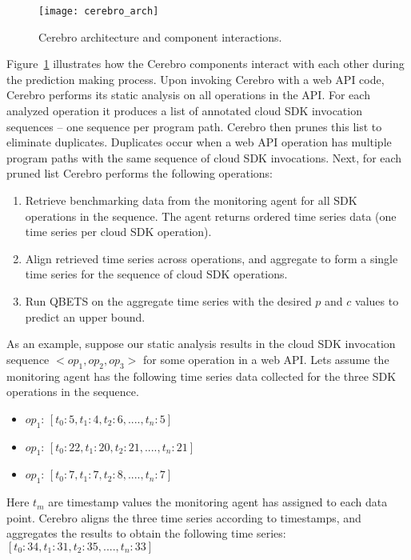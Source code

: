 \begin{figure}
\centering
\texttt{[image: cerebro\_arch]}
\caption{Cerebro architecture and component interactions.}
\label{fig:cerebro_arch}
\end{figure}

Figure~\ref{fig:cerebro_arch} illustrates how the Cerebro components interact with
each other during the prediction making process.
Upon invoking Cerebro with a web API code, Cerebro
performs its static analysis on all operations in the API. For each
analyzed operation it produces a list of annotated cloud SDK invocation sequences --
one sequence per program path. Cerebro then prunes this list to eliminate duplicates.
Duplicates occur when a web API operation has
multiple program paths with the same sequence of cloud SDK invocations.
Next, for each pruned list Cerebro performs the following operations:
\begin{enumerate}
\item Retrieve benchmarking data from the monitoring agent 
for all SDK operations in the sequence. The agent returns
ordered time series data (one time series per cloud SDK operation).
\item Align retrieved time series across operations, and aggregate
to form a single time series for the sequence of cloud SDK operations.
\item Run QBETS on the aggregate time series with the 
desired $p$ and $c$ values to predict an upper bound. 
\end{enumerate}

As an example, suppose our static analysis results in the
cloud SDK invocation sequence $<op_{1},op_{2},op_{3}>$ for
some operation in a web API. 
Lets assume the monitoring agent has the following
time series data collected for the three SDK operations in the sequence.
\begin{itemize}
\item $op_{1}$: $[t_{0}: 5, t_{1}: 4, t_{2}: 6, ...., t_{n}: 5]$
\item $op_{1}$: $[t_{0}: 22, t_{1}: 20, t_{2}: 21, ...., t_{n}: 21]$
\item $op_{1}$: $[t_{0}: 7, t_{1}: 7, t_{2}: 8, ...., t_{n}: 7]$
\end{itemize}

Here $t_{m}$ are timestamp values the monitoring agent has assigned to 
each data point. Cerebro aligns the three
time series according to timestamps, 
and aggregates the results
to obtain the following time series:
$[t_{0}: 34, t_{1}: 31, t_{2}: 35, ...., t_{n}: 33]$

